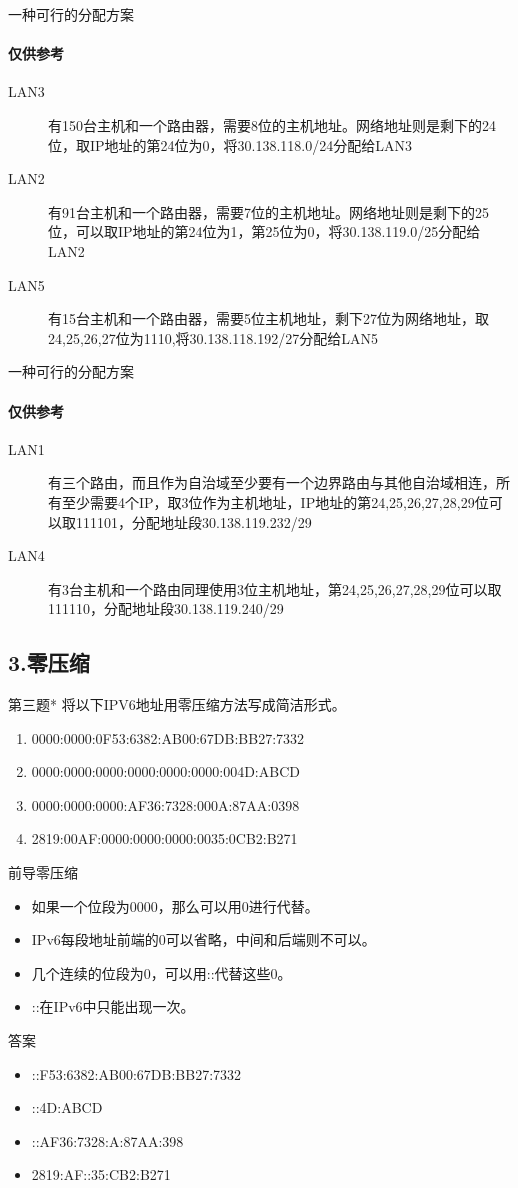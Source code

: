 \documentclass[handout]{beamer}
\begin{document}
\begin{frame}{一种可行的分配方案}
	\framesubtitle{仅供参考}
	\begin{description}
		\item[LAN3]有150台主机和一个路由器，需要8位的主机地址。网络地址则是剩下的24位，取IP地址的第24位为0，将30.138.118.0/24分配给LAN3
		\item[LAN2]有91台主机和一个路由器，需要7位的主机地址。网络地址则是剩下的25位，可以取IP地址的第24位为1，第25位为0，将30.138.119.0/25分配给LAN2
		\item[LAN5]有15台主机和一个路由器，需要5位主机地址，剩下27位为网络地址，取24,25,26,27位为1110,将30.138.118.192/27分配给LAN5
	\end{description}
\end{frame}

\begin{frame}{一种可行的分配方案}
	\framesubtitle{仅供参考}
	\begin{description}
	\item[LAN1]有三个路由，而且作为自治域至少要有一个边界路由与其他自治域相连，所有至少需要4个IP，取3位作为主机地址，IP地址的第24,25,26,27,28,29位可以取111101，分配地址段30.138.119.232/29
	\item[LAN4] 有3台主机和一个路由同理使用3位主机地址，第24,25,26,27,28,29位可以取111110，分配地址段30.138.119.240/29
	\end{description}
\end{frame}

\subsection{3.零压缩}
\begin{frame}{第三题*}
	将以下IPV6地址用零压缩方法写成简洁形式。
	\begin{enumerate}
		\item 0000:0000:0F53:6382:AB00:67DB:BB27:7332
		\item 0000:0000:0000:0000:0000:0000:004D:ABCD
		\item 0000:0000:0000:AF36:7328:000A:87AA:0398
		\item 2819:00AF:0000:0000:0000:0035:0CB2:B271
	\end{enumerate}
	
\end{frame}

\begin{frame}{前导零压缩}
	\begin{itemize}
		\item 如果一个位段为0000，那么可以用0进行代替。
		\item IPv6每段地址前端的0可以省略，中间和后端则不可以。
		\item 几个连续的位段为0，可以用::代替这些0。
	    \item ::在IPv6中只能出现一次。
	\end{itemize}
\end{frame}

\begin{frame}{答案}
\begin{itemize}
	\item ::F53:6382:AB00:67DB:BB27:7332
	\item ::4D:ABCD
	\item ::AF36:7328:A:87AA:398
	\item 2819:AF::35:CB2:B271
\end{itemize}	
\end{frame}
\end{document}
